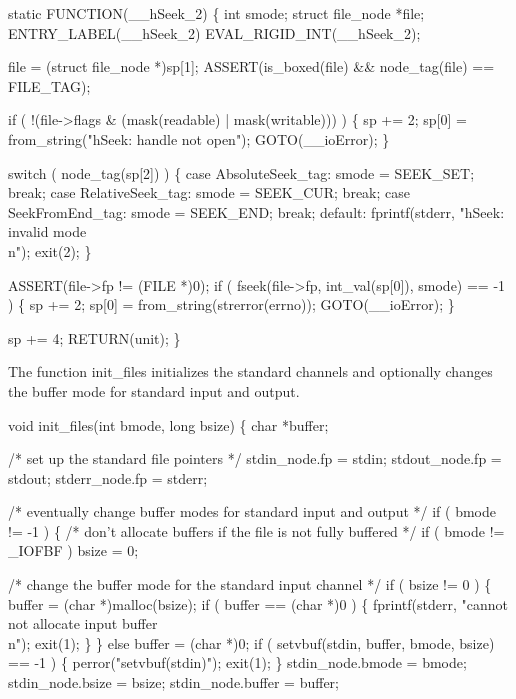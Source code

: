 static
FUNCTION(__hSeek_2)
\{
    int              smode;
    struct file_node *file;
 ENTRY_LABEL(__hSeek_2)
    EVAL_RIGID_INT(__hSeek_2);

    file = (struct file_node *)sp[1];
    ASSERT(is_boxed(file) && node_tag(file) == FILE_TAG);

    if ( !(file->flags & (mask(readable) | mask(writable))) )
    \{
        sp   += 2;
        sp[0] = from_string("hSeek: handle not open");
        GOTO(__ioError);
    \}

    switch ( node_tag(sp[2]) )
    \{
    case AbsoluteSeek_tag:
        smode = SEEK_SET;
        break;
    case RelativeSeek_tag:
        smode = SEEK_CUR;
        break;
    case SeekFromEnd_tag:
        smode = SEEK_END;
        break;
    default:
        fprintf(stderr, "hSeek: invalid mode\\n");
        exit(2);
    \}

    ASSERT(file->fp != (FILE *)0);
    if ( fseek(file->fp, int_val(sp[0]), smode) == -1 )
    \{
        sp   += 2;
        sp[0] = from_string(strerror(errno));
        GOTO(__ioError);
    \}

    sp += 4;
    RETURN(unit);
\}

\nwendcode{}\nwdocspar
The function {\Tt{}init{\_}files\nwendquote} initializes the standard channels and
optionally changes the buffer mode for standard input and output.

\nwenddocs{}\plusendmoddef\nwstartdeflinemarkup{}\nwenddeflinemarkup
void
init_files(int bmode, long bsize)
\{
    char *buffer;

    /* set up the standard file pointers */
    stdin_node.fp = stdin;
    stdout_node.fp = stdout;
    stderr_node.fp = stderr;

    /* eventually change buffer modes for standard input and output */
    if ( bmode != -1 )
    \{
        /* don't allocate buffers if the file is not fully buffered */
        if ( bmode != _IOFBF )
            bsize = 0;

        /* change the buffer mode for the standard input channel */
        if ( bsize != 0 )
        \{
            buffer = (char *)malloc(bsize);
            if ( buffer == (char *)0 )
            \{
                fprintf(stderr, "cannot not allocate input buffer\\n");
                exit(1);
            \}
        \}
        else
            buffer = (char *)0;
        if ( setvbuf(stdin, buffer, bmode, bsize) == -1 )
        \{
            perror("setvbuf(stdin)");
            exit(1);
        \}
        stdin_node.bmode  = bmode;
        stdin_node.bsize  = bsize;
        stdin_node.buffer = buffer;

